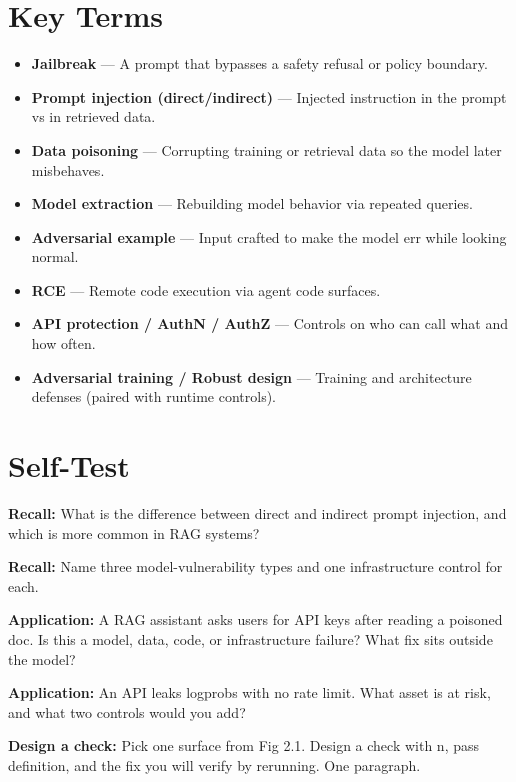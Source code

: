 \section{Key Terms}
\begin{itemize}
\item \textbf{Jailbreak} — A prompt that bypasses a safety refusal or policy boundary.
\item \textbf{Prompt injection (direct/indirect)} — Injected instruction in the prompt vs in retrieved data.
\item \textbf{Data poisoning} — Corrupting training or retrieval data so the model later misbehaves.
\item \textbf{Model extraction} — Rebuilding model behavior via repeated queries.
\item \textbf{Adversarial example} — Input crafted to make the model err while looking normal.
\item \textbf{RCE} — Remote code execution via agent code surfaces.
\item \textbf{API protection / AuthN / AuthZ} — Controls on who can call what and how often.
\item \textbf{Adversarial training / Robust design} — Training and architecture defenses (paired with runtime controls).
\end{itemize}

\section{Self-Test}
\begin{selftest}
\item \textbf{Recall:} What is the difference between direct and indirect prompt injection, and which is more common in RAG systems?
\item \textbf{Recall:} Name three model-vulnerability types and one infrastructure control for each.
\item \textbf{Application:} A RAG assistant asks users for API keys after reading a poisoned doc. Is this a model, data, code, or infrastructure failure? What fix sits outside the model?
\item \textbf{Application:} An API leaks logprobs with no rate limit. What asset is at risk, and what two controls would you add?
\item \textbf{Design a check:} Pick one surface from Fig 2.1. Design a check with n, pass definition, and the fix you will verify by rerunning. One paragraph.
\end{selftest}

